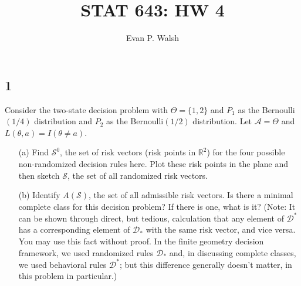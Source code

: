 \documentclass[12pt]{article}
\title{STAT 643: HW 4}
\author{Evan P. Walsh}
\begin{document}
\maketitle


\newcommand{\E}{\mathrm{E}}
\renewcommand{\baselinestretch}{1}

\subsection*{1}
\begin{tcolorbox}
  Consider the two-state decision problem with $\Theta=\{1,2\}$ and $P_1$ as the Bernoulli$(1/4)$ distribution and
  $P_2$ as the Bernoulli$(1/2)$ distribution. Let $\mathcal{A}=\Theta$ and $L(\theta,a)=I(\theta \neq a)$.
  \begin{enumerate}
    \item[(a)] Find $\mathcal{S}^0$, the set of risk vectors (risk points in $\mathbb{R}^2$) for the four possible non-randomized decision rules here.  Plot these risk points in the plane and then sketch $\mathcal{S}$, the set of all randomized risk vectors.
    \item[(b)] Identify $A(\mathcal{S})$, the set of all admissible risk vectors.  Is there a minimal complete class for this decision problem? If there is one, what is it?  (Note: It can be shown through direct, but tedious, calculation that any element of $\mathcal{D}^*$ has a corresponding element of $\mathcal{D}_*$ with the same risk vector, and vice versa.  You may use this fact without proof. In the finite geometry decision framework, we used randomized rules $\mathcal{D}_*$ and, in discussing complete classes, we used behavioral rules $\mathcal{D}^*$; but this difference generally doesn't matter, in this problem in particular.)
  \end{enumerate}
\end{tcolorbox}
\end{document}
